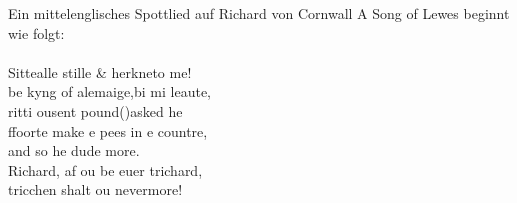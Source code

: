 \documentclass{scrartcl}
\begin{document}
Ein mittelenglisches \frq Spottlied auf Richard von Cornwall\flq 
\textbraceleft A Song of Lewes \textbraceright beginnt wie folgt:\\ \\ 

\glqq Sitte\th  alle stille \& herkne\th to me!\\
be kyng of alemaige,bi mi leaute,\\
\th ritti \th ousent pound(\textsterling)asked he\\
ffoorte make \th e pees in \th e countre,\\
\hspace*{4ex} and so he dude more.\\
\hspace*{2ex}  Richard, \th af \th ou be euer trichard,\\
\hspace*{4ex}tricchen shalt \th ou nevermore!\grqq
\end{document}

